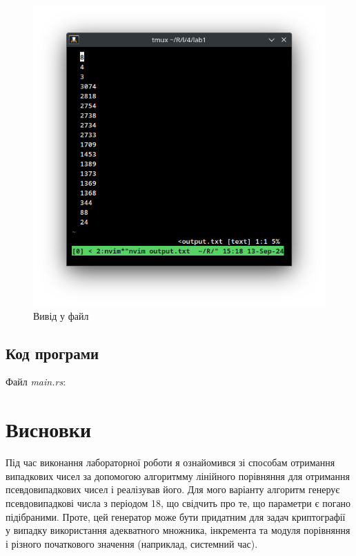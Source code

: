 \documentclass[oneside,14pt]{extarticle}
\begin{document}
\begin{normalsize}
\begin{figure}[H]
\begin{minipage}{0.45\textwidth}
			\includegraphics[scale=0.6]{2}
			\caption{Вивід у файл}
		\end{minipage}
	\end{figure}
	
	\subsection*{Код програми}
	Файл \textit{main.rs}:
	{\small	}
	
	\section*{Висновки}
	Під час виконання лабораторної роботи я ознайомився зі способам отримання випадкових чисел за допомогою алгоритмму лінійного порівняння для отримання псевдовипадкових чисел і реалізував його. Для мого варіанту алгоритм генерує псевдовипадкові числа з періодом 18, що свідчить про те, що параметри є погано підібраними. Проте, цей генератор може бути придатним для задач криптографії у випадку використання адекватного множника, інкремента та модуля порівняння і різного початкового значення (наприклад, системний час).
	    
\end{normalsize}
\end{document}
